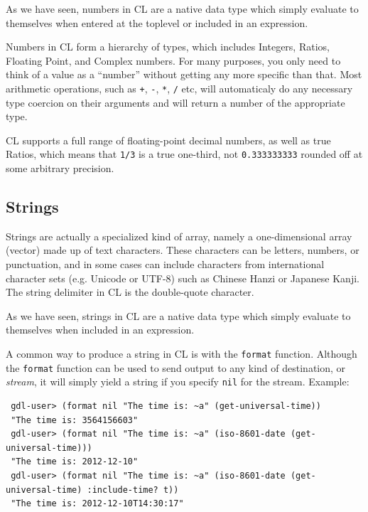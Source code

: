 \documentclass [11pt]{book}
\begin{document}
\label{subsec:numbers}



As we have seen, numbers in CL are a native
data type which simply evaluate to themselves when entered at the
toplevel or included in an expression.



Numbers in CL form a hierarchy of types, which includes Integers,
Ratios, Floating Point, and Complex numbers. For many purposes, you
only need to think of a value as a ``number'' without getting any more
specific than that. Most arithmetic operations, such as \texttt{+}, \texttt{-}, \texttt{*}, \texttt{/} etc, will automaticaly do any necessary type coercion on their
arguments and will return a number of the appropriate type.

CL supports a full range of floating-point decimal numbers, as well as
true Ratios, which means that \texttt{1/3} is a true one-third, not \texttt{0.333333333} rounded off at some arbitrary precision.



\subsection{Strings}

\label{subsec:strings}



Strings are actually a specialized kind of
array, namely a one-dimensional array (vector) made up of text
characters. These characters can be letters, numbers, or punctuation,
and in some cases can include characters from international character
sets (e.g. Unicode or UTF-8) such as Chinese Hanzi or Japanese
Kanji. The string delimiter in CL is the double-quote character.



As we have seen, strings in CL are a native data type which simply
evaluate to themselves when included in an expression.



A common way to produce a string in CL is with the \texttt{format} function. Although the \texttt{format} function can be used to send output to any kind of destination, or \emph{stream}, it will simply yield a string if you specify \texttt{nil} for the stream. Example: 
{\small

\begin{verbatim}
 gdl-user> (format nil "The time is: ~a" (get-universal-time))
 "The time is: 3564156603"
 gdl-user> (format nil "The time is: ~a" (iso-8601-date (get-universal-time)))
 "The time is: 2012-12-10"
 gdl-user> (format nil "The time is: ~a" (iso-8601-date (get-universal-time) :include-time? t))
 "The time is: 2012-12-10T14:30:17"
\end{verbatim}}
\end{document}

